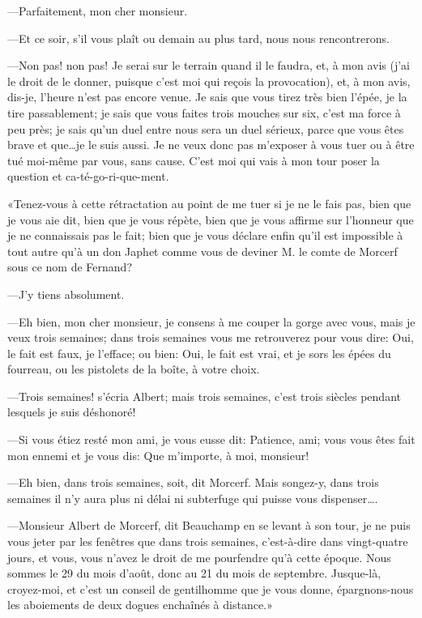 —Parfaitement, mon cher monsieur. 

—Et ce soir, s'il vous plaît ou demain au plus tard, nous nous rencontrerons. 

—Non pas! non pas! Je serai sur le terrain quand il le faudra, et, à mon avis (j'ai le droit de le donner, puisque c'est moi qui reçois la provocation), et, à mon avis, dis-je, l'heure n'est pas encore venue. Je sais que vous tirez très bien l'épée, je la tire passablement; je sais que vous faites trois mouches sur six, c'est ma force à peu près; je sais qu'un duel entre nous sera un duel sérieux, parce que vous êtes brave et que\dots je le suis aussi. Je ne veux donc pas m'exposer à vous tuer ou à être tué moi-même par vous, sans cause. C'est moi qui vais à mon tour poser la question et ca-té-go-ri-que-ment. 

«Tenez-vous à cette rétractation au point de me tuer si je ne le fais pas, bien que je vous aie dit, bien que je vous répète, bien que je vous affirme sur l'honneur que je ne connaissais pas le fait; bien que je vous déclare enfin qu'il est impossible à tout autre qu'à un don Japhet comme vous de deviner M. le comte de Morcerf sous ce nom de Fernand? 

—J'y tiens absolument. 

—Eh bien, mon cher monsieur, je consens à me couper la gorge avec vous, mais je veux trois semaines; dans trois semaines vous me retrouverez pour vous dire: Oui, le fait est faux, je l'efface; ou bien: Oui, le fait est vrai, et je sors les épées du fourreau, ou les pistolets de la boîte, à votre choix. 

—Trois semaines! s'écria Albert; mais trois semaines, c'est trois siècles pendant lesquels je suis déshonoré! 

—Si vous étiez resté mon ami, je vous eusse dit: Patience, ami; vous vous êtes fait mon ennemi et je vous dis: Que m'importe, à moi, monsieur! 

—Eh bien, dans trois semaines, soit, dit Morcerf. Mais songez-y, dans trois semaines il n'y aura plus ni délai ni subterfuge qui puisse vous dispenser\dots. 

—Monsieur Albert de Morcerf, dit Beauchamp en se levant à son tour, je ne puis vous jeter par les fenêtres que dans trois semaines, c'est-à-dire dans vingt-quatre jours, et vous, vous n'avez le droit de me pourfendre qu'à cette époque. Nous sommes le 29 du mois d'août, donc au 21 du mois de septembre. Jusque-là, croyez-moi, et c'est un conseil de gentilhomme que je vous donne, épargnons-nous les aboiements de deux dogues enchaînés à distance.» 

